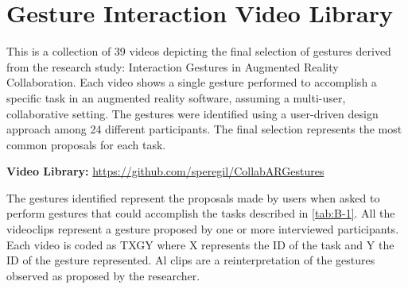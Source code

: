 \chapter{Gesture Interaction Video Library \label{appendix:b}}

This is a collection of 39 videos depicting the final selection of gestures derived from the research study: Interaction Gestures in Augmented Reality Collaboration. Each video shows a
single gesture performed to accomplish a specific task in an augmented reality software, assuming a multi-user, collaborative setting. The gestures were identified using a user-driven
design approach among 24 different participants. The final selection represents the most common proposals for each task.

\textbf{Video Library:} \url{https://github.com/speregil/CollabARGestures}

The gestures identified represent the proposals made by users when asked to perform gestures that could accomplish the tasks described in \ref{tab:B-1}. All the videoclips represent a
gesture proposed by one or more interviewed participants. Each video is coded as TXGY where X represents the ID of the task and Y the ID of the gesture represented. Al clips are a
reinterpretation of the gestures observed as proposed by the researcher.

